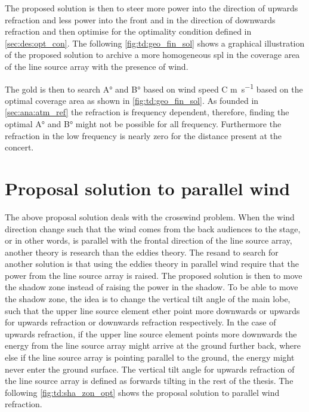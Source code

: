 The proposed solution is then to steer more power into the direction of upwards refraction and less power into the front and in the direction of downwards refraction and then optimise for the optimality condition defined in \autoref{sec:des:opt_con}. The following \autoref{fig:td:geo_fin_sol} shows a graphical illustration of the proposed solution to archive a more homogeneous \gls{spl} in the coverage area of the line source array with the presence of wind.


The gold is then to search A\si{\degree} and B\si{\degree} based on wind speed C \si{\meter\per\second} based on the optimal coverage area as shown in \autoref{fig:td:geo_fin_sol}. As founded in \autoref{sec:ana:atm_ref} the refraction is frequency dependent, therefore, finding the optimal  A\si{\degree} and B\si{\degree} might not be possible for all frequency. Furthermore the refraction in the low frequency is nearly zero for the distance present at the concert.  


\section{Proposal solution to parallel wind}\label{sec:des:pro_para}
The above proposal solution deals with the crosswind problem. When the wind direction change such that the wind comes from the back audiences to the stage, or in other words, is parallel with the frontal direction of the line source array, another theory is research than the eddies theory. The resand to search for another solution is that using the eddies theory in parallel wind require that the power from the line source array is raised. The proposed solution is then to move the shadow zone instead of raising the power in the shadow. To be able to move the shadow zone, the idea is to change the vertical tilt angle of the main lobe, such that the upper line source element ether point more downwards or upwards for upwards refraction or downwards refraction respectively. In the case of upwards refraction, if the upper line source element points more downwards the energy from the line source array might arrive at the ground further back, where else if the line source array is pointing parallel to the ground, the energy might never enter the ground surface. The vertical tilt angle for upwards refraction of the line source array is defined as forwards tilting in the rest of the thesis. The following \autoref{fig:td:sha_zon_opt} shows the proposal solution to parallel wind refraction.  

